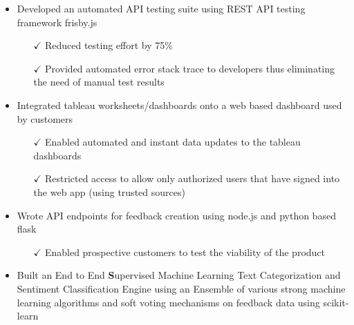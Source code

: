 \begin{itemize} \itemsep -2pt %
 \item Developed an automated API testing suite using REST API testing framework frisby.js \itemsep -2pt
   \begin{itemize}
     \item[$\checkmark$]  \itemsep -8pt%
   Reduced testing effort by 75\%\\
     \item[$\checkmark$]  \itemsep -8pt%
   Provided automated error stack trace to developers thus eliminating the need of manual test results\\
      \end{itemize}       
\end{itemize}

\begin{itemize} \itemsep -2pt %
 \item Integrated tableau worksheets/dashboards onto a web based dashboard used by customers \itemsep -2pt
   \begin{itemize}
     \item[$\checkmark$]  \itemsep -8pt%
   Enabled automated and instant data updates to the tableau dashboards\\
     \item[$\checkmark$]  \itemsep -8pt%
  Restricted access to allow only authorized users that have signed into the web app (using trusted sources) \\
      \end{itemize}       
\end{itemize}

\begin{itemize} \itemsep -2pt %
 \item Wrote API endpoints for feedback creation using node.js and python based flask \itemsep -2pt
   \begin{itemize}
     \item[$\checkmark$]  \itemsep -8pt%
   Enabled prospective customers to test the viability of the product\\
       \end{itemize}       
\end{itemize}

   \begin{itemize} \itemsep -2pt %
 \item Built an End to End {\textbf Supervised Machine Learning} Text Categorization and Sentiment Classification Engine using an Ensemble of various strong machine learning algorithms and soft voting mechanisms on feedback data using scikit-learn  \itemsep -2pt
\end{itemize}

